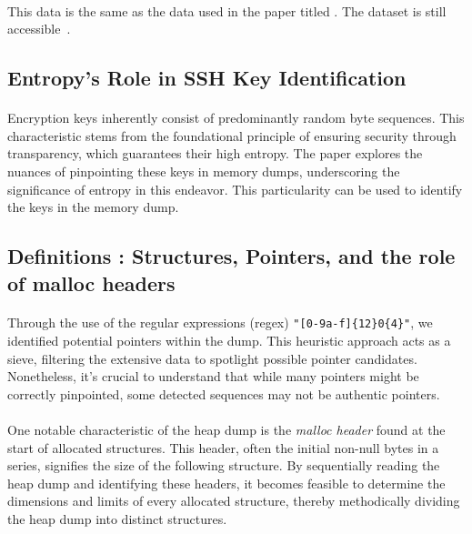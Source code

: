         \paragraph{}This data is the same as the data used in the paper titled  \cite{fellicious_smartkex_2022}. The dataset is still accessible~\cite{fellicious_machine_2022}.
     
    \subsection{Entropy's Role in SSH Key Identification}

        \paragraph{}Encryption keys\cite*{fellicious_smartkex_2022} inherently consist of predominantly random byte sequences. This characteristic stems from the foundational principle of ensuring security through transparency, which guarantees their high entropy. The paper explores the nuances of pinpointing these keys in memory dumps, underscoring the significance of entropy in this endeavor. This particularity can be used to identify the keys in the memory dump.
        
    \subsection{Definitions : Structures, Pointers, and the role of malloc headers}
    
        \paragraph{}Through the use of the regular expressions (\acrshort{regex}) \texttt{"[0-9a-f]\{12\}0\{4\}"}, we identified potential \glspl{pointer} within the dump. This heuristic approach acts as a sieve, filtering the extensive data to spotlight possible \gls{pointer} candidates. Nonetheless, it's crucial to understand that while many \glspl{pointer} might be correctly pinpointed, some detected sequences may not be authentic \glspl{pointer}.

        \paragraph{}One notable characteristic of the heap dump is the \textit{malloc header} found at the start of allocated \glspl{structure}. This header, often the initial non-null bytes in a series, signifies the size of the following \gls{structure}. By sequentially reading the heap dump and identifying these headers, it becomes feasible to determine the dimensions and limits of every allocated \gls{structure}, thereby methodically dividing the heap dump into distinct \glspl{structure}.
        
